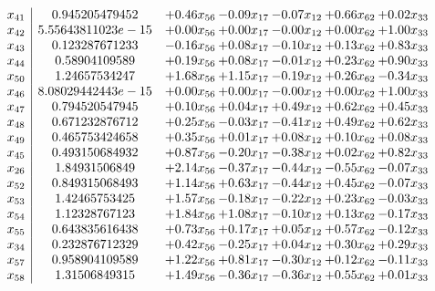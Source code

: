 \documentclass[8pt]{article}
\begin{document}
\[\begin{array}{c| c c@{\hskip 2pt} c@{\hskip 2pt} c@{\hskip 2pt} c@{\hskip 2pt} c@{\hskip 2pt} }
 x_{41}   &  0.945205479452 & +  0.46 x_{56} & -0.09 x_{17} & -0.07 x_{12} & +  0.66 x_{62} & +  0.02 x_{33}\\
 x_{42}   &  5.55643811023e-15 & +  0.00 x_{56} & +  0.00 x_{17} & -0.00 x_{12} & +  0.00 x_{62} & +  1.00 x_{33}\\
 x_{43}   &  0.123287671233 & -0.16 x_{56} & +  0.08 x_{17} & -0.10 x_{12} & +  0.13 x_{62} & +  0.83 x_{33}\\
 x_{44}   &  0.58904109589 & +  0.19 x_{56} & +  0.08 x_{17} & -0.01 x_{12} & +  0.23 x_{62} & +  0.90 x_{33}\\
 x_{50}   &  1.24657534247 & +  1.68 x_{56} & +  1.15 x_{17} & -0.19 x_{12} & +  0.26 x_{62} & -0.34 x_{33}\\
 x_{46}   &  8.08029442443e-15 & +  0.00 x_{56} & +  0.00 x_{17} & -0.00 x_{12} & +  0.00 x_{62} & +  1.00 x_{33}\\
 x_{47}   &  0.794520547945 & +  0.10 x_{56} & +  0.04 x_{17} & +  0.49 x_{12} & +  0.62 x_{62} & +  0.45 x_{33}\\
 x_{48}   &  0.671232876712 & +  0.25 x_{56} & -0.03 x_{17} & -0.41 x_{12} & +  0.49 x_{62} & +  0.62 x_{33}\\
 x_{49}   &  0.465753424658 & +  0.35 x_{56} & +  0.01 x_{17} & +  0.08 x_{12} & +  0.10 x_{62} & +  0.08 x_{33}\\
 x_{45}   &  0.493150684932 & +  0.87 x_{56} & -0.20 x_{17} & -0.38 x_{12} & +  0.02 x_{62} & +  0.82 x_{33}\\
 x_{26}   &  1.84931506849 & +  2.14 x_{56} & -0.37 x_{17} & -0.44 x_{12} & -0.55 x_{62} & -0.07 x_{33}\\
 x_{52}   &  0.849315068493 & +  1.14 x_{56} & +  0.63 x_{17} & -0.44 x_{12} & +  0.45 x_{62} & -0.07 x_{33}\\
 x_{53}   &  1.42465753425 & +  1.57 x_{56} & -0.18 x_{17} & -0.22 x_{12} & +  0.23 x_{62} & -0.03 x_{33}\\
 x_{54}   &  1.12328767123 & +  1.84 x_{56} & +  1.08 x_{17} & -0.10 x_{12} & +  0.13 x_{62} & -0.17 x_{33}\\
 x_{55}   &  0.643835616438 & +  0.73 x_{56} & +  0.17 x_{17} & +  0.05 x_{12} & +  0.57 x_{62} & -0.12 x_{33}\\
 x_{34}   &  0.232876712329 & +  0.42 x_{56} & -0.25 x_{17} & +  0.04 x_{12} & +  0.30 x_{62} & +  0.29 x_{33}\\
 x_{57}   &  0.958904109589 & +  1.22 x_{56} & +  0.81 x_{17} & -0.30 x_{12} & +  0.12 x_{62} & -0.11 x_{33}\\
 x_{58}   &  1.31506849315 & +  1.49 x_{56} & -0.36 x_{17} & -0.36 x_{12} & +  0.55 x_{62} & +  0.01 x_{33}\\

\end{array}\]
\end{document}
